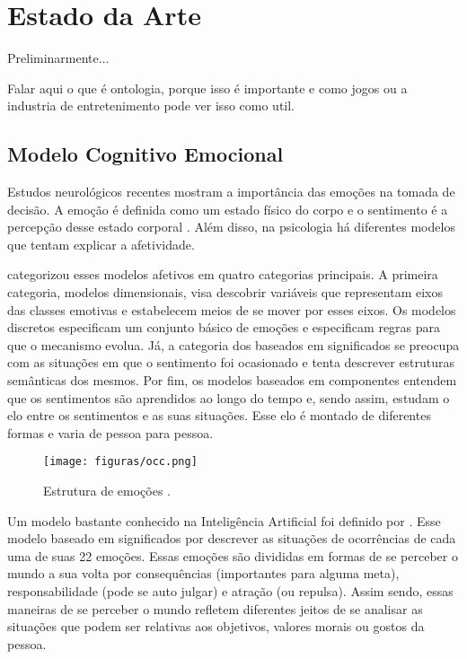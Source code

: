 \chapter{Estado da Arte} \label{cap:eda}

Preliminarmente...

Falar aqui o que é ontologia, porque isso é importante e como jogos ou a
industria de entretenimento pode ver isso como util.

\section{Modelo Cognitivo Emocional} \label{cap:eda:mce}

Estudos neurológicos recentes \cite{ledoux1998emotional,damasio2004erro}
mostram a importância das emoções na tomada de decisão. A emoção é definida
como um estado físico do corpo e o sentimento é a percepção desse estado
corporal \cite{damasio2004erro}. Além disso, na psicologia há diferentes
modelos que tentam explicar a afetividade.

\citet{scherer2000tnoe} categorizou esses modelos afetivos em quatro
categorias principais. A primeira categoria, modelos dimensionais, visa
descobrir variáveis que representam eixos das classes emotivas e estabelecem
meios de se mover por esses eixos. Os modelos discretos especificam um
conjunto básico de emoções e especificam regras para que o mecanismo evolua.
Já, a categoria dos baseados em significados se preocupa com as situações
em que o sentimento foi ocasionado e tenta descrever estruturas semânticas dos
mesmos. Por fim, os modelos baseados em componentes entendem que os
sentimentos são aprendidos ao longo do tempo e, sendo assim, estudam o elo
entre os sentimentos e as suas situações. Esse elo é montado de diferentes
formas e varia de pessoa para pessoa.

\begin{figure}[t]
  \centering
    \texttt{[image: figuras/occ.png]}
  \caption{Estrutura de emoções \cite{ortony1988cse}.}
  \label{fig:occ_model}
\end{figure}

Um modelo bastante conhecido na Inteligência Artificial foi definido por
\citet{ortony1988cse}. Esse modelo baseado em 
significados por descrever as situações de ocorrências de cada uma de suas 22
emoções.  Essas emoções são divididas em formas de se perceber o mundo a sua
volta por consequências (importantes para alguma meta), responsabilidade (pode
se auto julgar) e atração (ou repulsa). Assim sendo, essas maneiras de se
perceber o mundo refletem diferentes jeitos de se analisar as situações que
podem ser relativas aos objetivos, valores morais ou gostos da pessoa.


